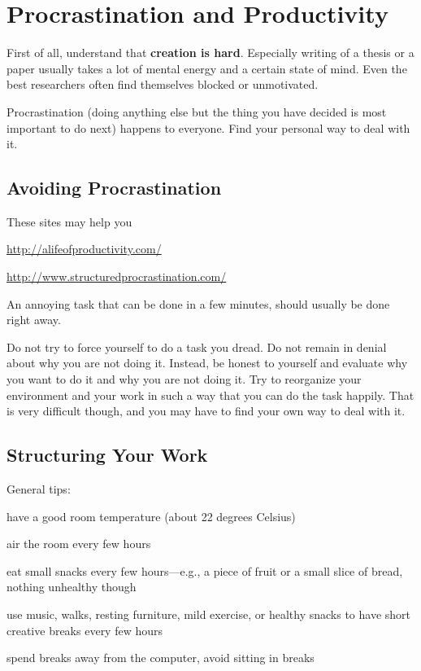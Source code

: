 \documentclass[12pt]{article}
\begin{document}
\section{Procrastination and Productivity}

First of all, understand that \textbf{creation is hard}.
Especially writing of a thesis or a paper usually takes a lot of mental energy and a certain state of mind.
Even the best researchers often find themselves blocked or unmotivated.

Procrastination (doing anything else but the thing you have decided is most important to do next) happens to everyone.
Find your personal way to deal with it.

\subsection{Avoiding Procrastination}

These sites may help you
\begin{compactitem}
\item \url{http://alifeofproductivity.com/}
\item \url{http://www.structuredprocrastination.com/}
\end{compactitem}
\medskip

An annoying task that can be done in a few minutes, should usually be done right away.
\medskip

Do not try to force yourself to do a task you dread.
Do not remain in denial about why you are not doing it.
Instead, be honest to yourself and evaluate why you want to do it and why you are not doing it.
Try to reorganize your environment and your work in such a way that you can do the task happily.
That is very difficult though, and you may have to find your own way to deal with it.

\subsection{Structuring Your Work}

General tips:
\begin{compactitem}
\item have a good room temperature (about 22 degrees Celsius)
\item air the room every few hours
\item eat small snacks every few hours---e.g., a piece of fruit or a small slice of bread, nothing unhealthy though
\item use music, walks, resting furniture, mild exercise, or healthy snacks to have short creative breaks every few hours
\item spend breaks away from the computer, avoid sitting in breaks
\end{compactitem}
\medskip
\end{document}
